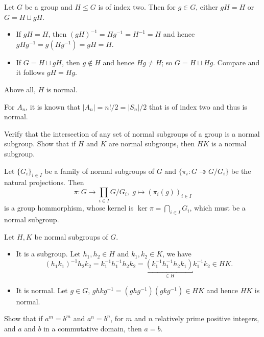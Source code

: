\begin{solution}
    Let $G$ be a group and $H\leq G$ is of index two. Then for $g\in G$, either $ g H=H$ or $G=H\sqcup g H$. 
    \begin{itemize}
        \item If $g H=H$, then $(g H)^{-1}=H g^{-1}=H^{-1}=H$ and hence $g H g^{-1}=g (H g^{-1})=g H=H$.
        \item If $G=H\sqcup g H$, then $g\notin H$ and hence $H g\neq H$; so $G=H\sqcup H g$. Compare and it follows $g H =H g$.
    \end{itemize}
    Above all, $H$ is normal.
    \par For $A_{n}$, it is known that $|A_{n}|=n!/2=|S_{n}|/2$ that is of index two and thus is normal.
\end{solution}

\begin{problem}
    Verify that the intersection of any set of normal subgroups of a group is a normal subgroup. 
    Show that if $H$ and $K$ are normal subgroups, then $HK$ is a normal subgroup.
\end{problem}


\begin{solution}
    Let $\{G_{i}\}_{i\in I}$ be a family of normal subgroups of $G$ and $\{\pi_{i}\colon G\twoheadrightarrow G/G_{i}\}$ 
    be the natural projections. Then 
        \[
            \pi\colon G \to \prod_{i\in I}G/G_{i},\; g\mapsto (\pi_{i}(g))_{i\in I}
        \]
    is a group hommorphism, whose kernel is $\ker\pi=\bigcap_{i\in I}G_{i}$, which must be a normal subgroup.
\par Let $H,K$ be normal subgroups of $G$. 
    \begin{itemize}
        \item It is a subgroup. Let $h_{1},h_{2}\in H$ and $k_{1},k_{2}\in K$, we have
            \[
                (h_{1}k_{1})^{-1}h_{2}k_{2}=k_{1}^{-1}h_{1}^{-1}h_{2}k_{2}=\underbracket{(k_{1}^{-1}h_{1}^{-1}h_{2}k_{1})}_{\in H}k_{1}^{-1}k_{2}\in H K.
            \]
        \item It is normal. Let $g\in G$, $g h k g^{-1}=(g h g^{-1}) (g k g^{-1})\in H K$ and hence $H K$ is normal.
    \end{itemize}
\end{solution}

\setcounter{pb}{15}
\begin{problem}
    Show that if $ a^m = b^m $ and $ a^n = b^n $, for $ m $ and $ n $ relatively prime positive integers, and $ a $ and $ b $ in a commutative domain, then $ a = b $.
\end{problem}

